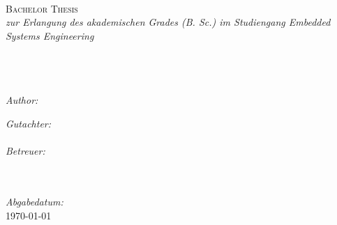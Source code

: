 \documentclass[a4paper, 11pt, oneside]{Thesis} %
\begin{document}
\begin{titlepage}
\begin{center}

\textsc{\LARGE \univname}\\[1.5cm] %
\deptname\\\groupname\\[2cm] %


\textsc{\Large Bachelor Thesis}\\[0.5cm] %

\large \textit{zur Erlangung des akademischen Grades \degreename (B. Sc.) im Studiengang Embedded Systems Engineering} \\[0.3cm] %




\HRule \\[0.4cm] %
{\huge \bfseries \ttitle}\\[0.4cm] %
\HRule \\[1.5cm] %
 
\begin{minipage}{0.4\textwidth}
\begin{flushleft} \large
\emph{Author:}\\
{\authornames} %
\end{flushleft}
\end{minipage}
\begin{minipage}{0.4\textwidth}
\begin{flushright} \large
\emph{Gutachter:} \\
{\examname} \\
\emph{Betreuer:} \\
{\supname} \\
\end{flushright}
\end{minipage}\\[3cm]
 
\emph{Abgabedatum:}\\
{\large \today}\\[4cm] %
 
\vfill
\end{center}

\end{titlepage}

\end{document}

